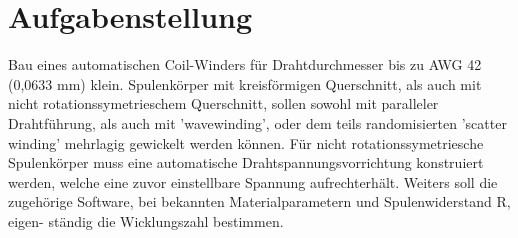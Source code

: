 \section{Aufgabenstellung}
\label{sec:Aufgabenstellung}


Bau eines automatischen Coil-Winders für Drahtdurchmesser bis zu AWG 42 (0,0633 mm) klein. Spulenkörper mit kreisförmigen Querschnitt, als auch mit nicht rotationssymetrieschem Querschnitt, sollen sowohl mit paralleler Drahtführung, als auch mit ’wavewinding’, oder dem teils randomisierten ’scatter winding’ mehrlagig gewickelt werden können. Für nicht rotationssymetriesche Spulenkörper muss eine automatische Drahtspannungsvorrichtung konstruiert werden, welche eine zuvor einstellbare Spannung aufrechterhält. Weiters soll die zugehörige Software, bei bekannten Materialparametern und Spulenwiderstand R, eigen-
ständig die Wicklungszahl bestimmen.